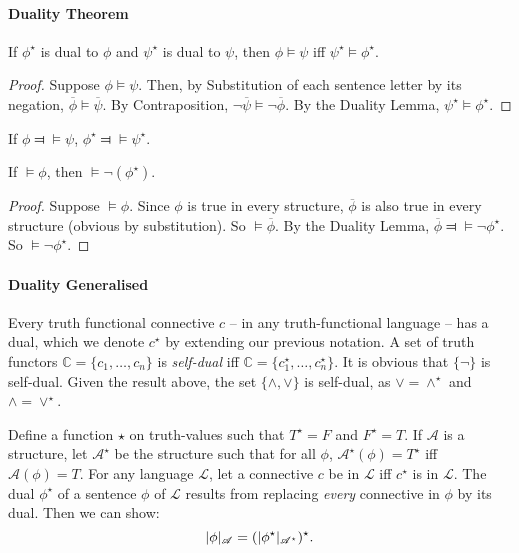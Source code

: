 \paragraph{Duality Theorem}

 \begin{theorem}
	If $\phi^{\star}$ is dual to $\phi$ and $\psi^{\star}$ is dual to $\psi$, then $\phi \vDash \psi$ iff $\psi^{\star}\vDash \phi^{\star}$.\begin{proof}
		Suppose $\phi\vDash\psi$. Then, by Substitution of each sentence letter by its negation, $\overline{\phi}\vDash\overline{\psi}$. By Contraposition, $\neg\overline{\psi}\vDash\neg\overline{\phi}$. By the Duality Lemma, $\psi^{\star}\vDash\phi^{\star}$. 
	\end{proof}
\end{theorem}
\begin{corol} If $\phi \Dashv\vDash \psi$, $\phi^{\star}\Dashv\vDash\psi^{\star}$.
\end{corol}

\begin{theorem} If $\vDash \phi$, then $\vDash \neg(\phi^{\star})$. \begin{proof}
	Suppose $\vDash\phi$. Since $\phi$ is true in every structure, $\overline{\phi}$ is also true in every structure (obvious by substitution). So $\vDash \overline{\phi}$. By the Duality Lemma, $\overline{\phi}\Dashv\vDash\neg\phi^{\star}$. So $\vDash \neg\phi^{\star}$.
\end{proof}
\end{theorem}

\paragraph{Duality Generalised}

Every truth functional connective $c$ – in any truth-functional language – has a dual, which we denote $c^{\star}$ by extending our previous notation. A set of truth functors $\mathbb{C}=\{c_{1},\ldots,c_{n}\}$ is \emph{self-dual} iff $\mathbb{C} = \{c_{1}^{\star},\ldots,c_{n}^{\star}\}$. It is obvious that $\{\neg\}$ is self-dual. Given the result above, the set $\{\wedge,\vee\}$ is self-dual, as $\vee = \wedge^{\star}$ and $\wedge = \vee^{\star}$.

Define a function $\star$ on truth-values such that $T^{\star}=F$ and $F^{\star}=T$. If $\mathscr{A}$ is a structure, let $\mathscr{A}^{\star}$ be the structure such that for all $\phi$, $\mathscr{A}^{\star}(\phi)=T^{\star}$ iff $\mathscr{A}(\phi)=T$. For any language $\mathcal{L}$, let a connective $c$ be in $\mathcal{L}$ iff $c^{\star}$ is in $\mathcal{L}$. The dual $\phi^{\star}$ of a sentence $\phi$ of $\mathcal{L}$ results from replacing \emph{every} connective in $\phi$ by its dual. Then we can show: $$|\phi|_{\mathscr{A}} = (|\phi^{\star}|_{\mathscr{A^{\star}}})^{\star}.$$ 





